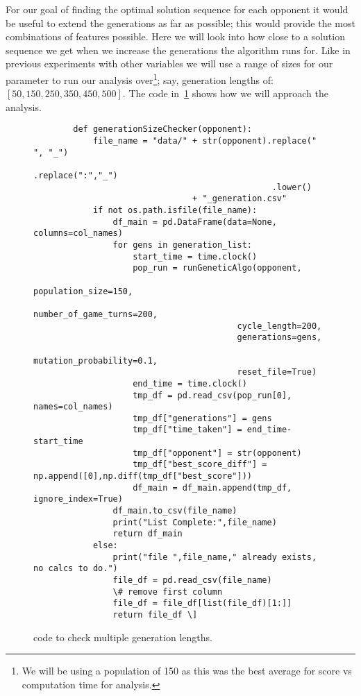 For our goal of finding the optimal solution sequence for each opponent it would be useful to extend the generations as far as possible; this would provide the most combinations of features possible.
Here we will look into how close to a solution sequence we get when we increase the generations the algorithm runs for.
Like in previous experiments with other variables we will use a range of sizes for our parameter to run our analysis over\footnote{We will be using a population of 150 as this was the best average for score vs computation time for analysis.}; say, generation lengths of: \([50,150,250,350,450,500]\). 
The code in~\ref{code:generationChecker} shows how we will approach the analysis.\\ 

\begin{figure}\label{code:generationChecker}
    \begin{verbatim}
        def generationSizeChecker(opponent):
            file_name = "data/" + str(opponent).replace(" ", "_")
                                                .replace(":","_")
                                                .lower() 
                                + "_generation.csv"
            if not os.path.isfile(file_name):
                df_main = pd.DataFrame(data=None, columns=col_names)
                for gens in generation_list:
                    start_time = time.clock()
                    pop_run = runGeneticAlgo(opponent,
                                         population_size=150,
                                         number_of_game_turns=200,
                                         cycle_length=200, 
                                         generations=gens,
                                         mutation_probability=0.1, 
                                         reset_file=True)
                    end_time = time.clock()
                    tmp_df = pd.read_csv(pop_run[0], names=col_names)
                    tmp_df["generations"] = gens
                    tmp_df["time_taken"] = end_time-start_time
                    tmp_df["opponent"] = str(opponent)
                    tmp_df["best_score_diff"] = np.append([0],np.diff(tmp_df["best_score"]))
                    df_main = df_main.append(tmp_df, ignore_index=True)
                df_main.to_csv(file_name)
                print("List Complete:",file_name)
                return df_main
            else:
                print("file ",file_name," already exists, no calcs to do.")
                file_df = pd.read_csv(file_name) 
                \# remove first column
                file_df = file_df[list(file_df)[1:]]
                return file_df \]
    \end{verbatim}
    \caption{code to check multiple generation lengths.}    
\end{figure}
    
